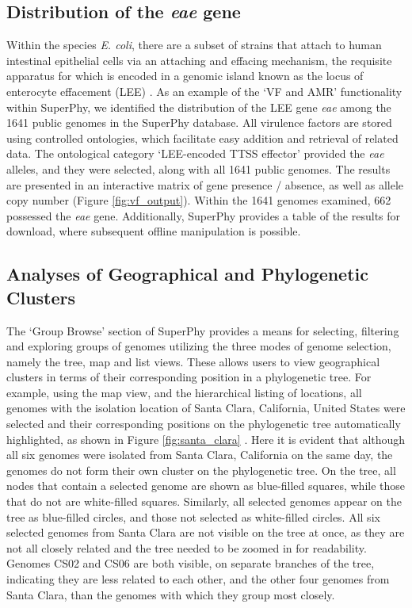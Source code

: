 \documentclass[doublespacing, linenumbers]{bmcart}
\begin{document}
\subsection{Distribution of the \textit{eae} gene}
Within the species \textit{E. coli}, there are a subset of strains that attach to human intestinal epithelial cells via an attaching and effacing mechanism, the requisite apparatus for which is encoded in a genomic island known as the locus of enterocyte effacement (LEE) \cite{croxen_recent_2013}. As an example of the `VF and AMR' functionality within SuperPhy, we identified the distribution of the LEE gene \textit{eae} among the 1641 public genomes in the SuperPhy database. All virulence factors are stored using controlled ontologies, which facilitate easy addition and retrieval of related data. The ontological category `LEE-encoded TTSS effector' provided the \textit{eae} alleles, and they were selected, along with all 1641 public genomes. The results are presented in an interactive matrix of gene presence / absence, as well as allele copy number (Figure \ref{fig:vf_output}). Within the 1641 genomes examined, 662 possessed the \textit{eae} gene. Additionally, SuperPhy provides a table of the results for download, where subsequent offline manipulation is possible.

\subsection{Analyses of Geographical and Phylogenetic Clusters}
The `Group Browse' section of SuperPhy provides a means for selecting, filtering and exploring groups of genomes utilizing the three modes of genome selection, namely the tree, map and list views. These allows users to view geographical clusters in terms of their corresponding position in a phylogenetic tree. For example, using the map view, and the hierarchical listing of locations, all genomes with the isolation location of Santa Clara, California, United States were selected and their corresponding positions on the phylogenetic tree automatically highlighted, as shown in Figure \ref{fig:santa_clara} . Here it is evident that although all six genomes were isolated from Santa Clara, California on the same day, the genomes do not form their own cluster on the phylogenetic tree. On the tree, all nodes that contain a selected genome are shown as blue-filled squares, while those that do not are white-filled squares. Similarly, all selected genomes appear on the tree as blue-filled circles, and those not selected as white-filled circles. All six selected genomes from Santa Clara are not visible on the tree at once, as they are not all closely related and the tree needed to be zoomed in for readability. Genomes CS02 and CS06 are both visible, on separate branches of the tree, indicating they are less related to each other, and the other four genomes from Santa Clara, than the genomes with which they group most closely.
\end{document}
